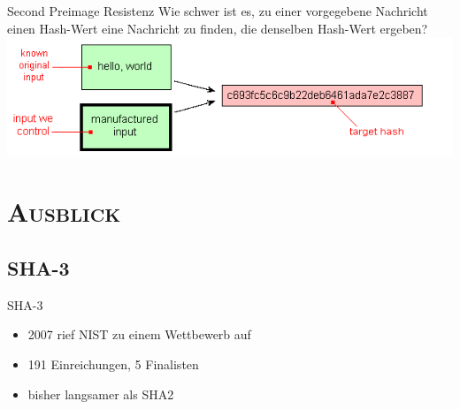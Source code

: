 \documentclass[xcolor=x11names,compress]{beamer}
\renewcommand{\(}{\begin{columns}}
\renewcommand{\)}{\end{columns}}
\newcommand{\<}[1]{\begin{column}{#1}}
\renewcommand{\>}{\end{column}}
\begin{document}
\begin{frame}{Second Preimage Resistenz}
Wie schwer ist es, zu einer vorgegebene Nachricht einen Hash-Wert eine Nachricht zu finden, die denselben Hash-Wert ergeben? \\
\includegraphics[scale=0.52]{2nd-preimage-resistance.png}
\end{frame}

\section{\scshape Ausblick}
\subsection{SHA-3}
\begin{frame}{SHA-3}
\begin{itemize}
	\item 2007 rief NIST zu einem Wettbewerb auf
\pause	
	\item 191 Einreichungen, 5 Finalisten
\pause
	\item bisher langsamer als SHA2
\end{itemize}
\end{frame}
\end{document}
